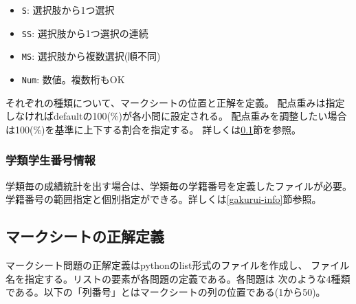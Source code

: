 \begin{itemize}
\item \texttt{S}: 選択肢から1つ選択

\item \texttt{SS}: 選択肢から1つ選択の連続

\item \texttt{MS}: 選択肢から複数選択(順不同)

\item \texttt{Num}: 数値。複数桁もOK

\end{itemize}
それぞれの種類について、マークシートの位置と正解を定義。
配点重みは指定しなければdefaultの100(\%)が各小問に設定される。
配点重みを調整したい場合は100(\%)を基準に上下する割合を指定する。
詳しくは\ref{mksheet-ref}節を参照。

\subsubsection{学類学生番号情報}
\label{学類学生番号情報}

学類毎の成績統計を出す場合は、学類毎の学籍番号を定義したファイルが必要。
学籍番号の範囲指定と個別指定ができる。詳しくは\ref{gakurui-info}節参照。

\subsection{マークシートの正解定義}
\label{mksheet-ref}

マークシート問題の正解定義はpythonのlist形式のファイルを作成し、
ファイル名を指定する。リストの要素が各問題の定義である。各問題は
次のような4種類である。以下の「列番号」とはマークシートの列の位置である(1から50)。

